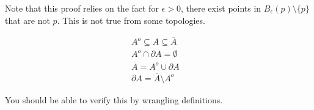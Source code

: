 Note that this proof relies on the fact for $\epsilon > 0$, there exist points in $B_ \epsilon (p) \setminus \{ p \}$ that are not $p$. This is not true from some topologies. 

\begin{simplethm}
\begin{align*}
    A^o \subseteq A \subseteq \overline{A} &\\ A^o \cap \partial A = \emptyset &\\ \overline{A} = A^o \cup \partial A &\\ \partial A = \overline{A} \setminus A^o
\end{align*}
\end{simplethm}

You should be able to verify this by wrangling definitions.
